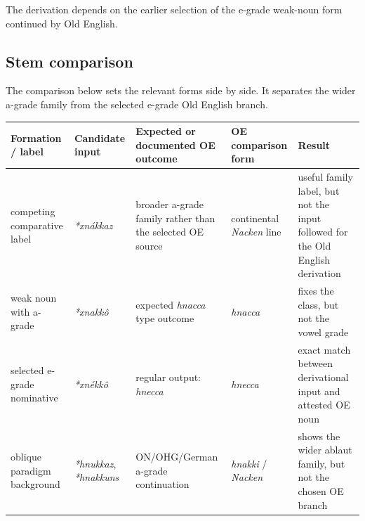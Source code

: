 \documentclass[
  british,
  a4paper,
  openany]{book}
\newcounter{none} %
\begin{document}
The derivation depends on the earlier selection of the e-grade weak-noun
form continued by Old English.

\subsection{Stem comparison}\label{stem-comparison-3}

The comparison below sets the relevant forms side by side. It separates
the wider a-grade family from the selected e-grade Old English branch.

{\def\LTcaptype{none} %
\begin{longtable}[]{@{}
  >{\raggedright\arraybackslash}p{}
  >{\raggedright\arraybackslash}p{}
  >{\raggedright\arraybackslash}p{}
  >{\raggedright\arraybackslash}p{}
  >{\raggedright\arraybackslash}p{}@{}}
\toprule\noalign{}
\begin{minipage}[b]{\linewidth}\raggedright
Formation / label
\end{minipage} & \begin{minipage}[b]{\linewidth}\raggedright
Candidate input
\end{minipage} & \begin{minipage}[b]{\linewidth}\raggedright
Expected or documented OE outcome
\end{minipage} & \begin{minipage}[b]{\linewidth}\raggedright
OE comparison form
\end{minipage} & \begin{minipage}[b]{\linewidth}\raggedright
Result
\end{minipage} \\
\midrule\noalign{}
\endhead
\bottomrule\noalign{}
\endlastfoot
competing comparative label & {\emph{*xnákkaz}} & broader a-grade family
rather than the selected OE source & continental {\emph{Nacken}} line &
useful family label, but not the input followed for the Old English
derivation \\
weak noun with a-grade & {\emph{*xnakkô}} & expected {\emph{hnacca}}
type outcome & {\emph{hnacca}} & fixes the class, but not the vowel
grade \\
selected e-grade nominative & {\emph{*xnékkô}} & regular output:
{\emph{hnecca}} & {\emph{hnecca}} & exact match between derivational
input and attested OE noun \\
oblique paradigm background & {\emph{*hnukkaz}}, {\emph{*hnakkuns}} &
ON/OHG/German a-grade continuation & {\emph{hnakki}} / {\emph{Nacken}} &
shows the wider ablaut family, but not the chosen OE branch \\
\end{longtable}
}
\end{document}
